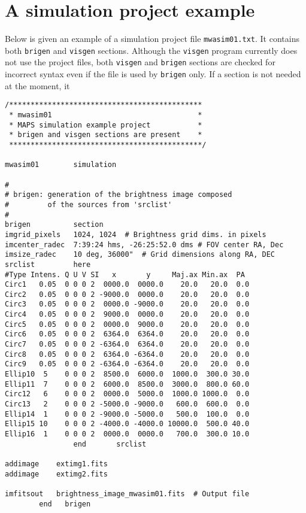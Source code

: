 \documentclass[letterpaper, oneside, 11pt]{article}
\begin{document}
\section{A simulation project example}

Below is given an example of a simulation project file {\tt mwasim01.txt}. It contains both {\tt brigen} and {\tt visgen} sections. Although the {\tt visgen} program currently does not use the project files, both {\tt visgen} and {\tt brigen} sections are checked for incorrect syntax even if the file is used by {\tt brigen} only. If a section is not needed at the moment, it  
 
\begin{verbatim}
/*********************************************
 * mwasim01                                  *
 * MAPS simulation example project           *
 * brigen and visgen sections are present    *
 *********************************************/

mwasim01        simulation

#
# brigen: generation of the brightness image composed
#         of the sources from 'srclist'
# 
brigen	        section
imgrid_pixels   1024, 1024  # Brightness grid dims. in pixels 
imcenter_radec  7:39:24 hms, -26:25:52.0 dms # FOV center RA, Dec
imsize_radec    10 deg, 36000"  # Grid dimensions along RA, DEC
srclist	        here
#Type Intens. Q U V SI   x       y     Maj.ax Min.ax  PA
Circ1   0.05  0 0 0 2  0000.0  0000.0    20.0   20.0  0.0
Circ2   0.05  0 0 0 2 -9000.0  0000.0    20.0   20.0  0.0
Circ3   0.05  0 0 0 2  0000.0 -9000.0    20.0   20.0  0.0
Circ4   0.05  0 0 0 2  9000.0  0000.0    20.0   20.0  0.0
Circ5   0.05  0 0 0 2  0000.0  9000.0    20.0   20.0  0.0
Circ6   0.05  0 0 0 2  6364.0  6364.0    20.0   20.0  0.0
Circ7   0.05  0 0 0 2 -6364.0  6364.0    20.0   20.0  0.0
Circ8   0.05  0 0 0 2  6364.0 -6364.0    20.0   20.0  0.0
Circ9   0.05  0 0 0 2 -6364.0 -6364.0    20.0   20.0  0.0
Ellip10  5    0 0 0 2  8500.0  6000.0  1000.0  300.0 30.0
Ellip11  7    0 0 0 2  6000.0  8500.0  3000.0  800.0 60.0
Circ12   6    0 0 0 2  0000.0  5000.0  1000.0 1000.0  0.0
Circ13   2    0 0 0 2 -5000.0 -9000.0   600.0  600.0  0.0
Ellip14  1    0 0 0 2 -9000.0 -5000.0   500.0  100.0  0.0
Ellip15 10    0 0 0 2 -4000.0 -4000.0 10000.0  500.0 40.0
Ellip16  1    0 0 0 2  0000.0  0000.0   700.0  300.0 10.0
    	        end 	  srclist

addimage   	extimg1.fits
addimage   	extimg2.fits

imfitsout  	brightness_image_mwasim01.fits	# Output file
	   	end	  brigen


\end{verbatim}
\end{document}
